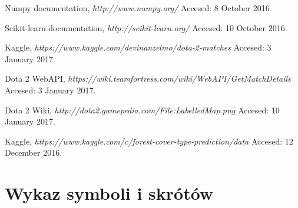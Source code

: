 \documentclass[pl]{minipw} %
\begin{document}
\begin{thebibliography}{20}
  Numpy documentation,
  \emph{http://www.numpy.org/}
  Accesed: 8 October 2016.  
  
  Scikit-learn documentation,
  \emph{http://scikit-learn.org/}  
  Accesed: 10 October 2016.
  
  Kaggle,
  \emph{https://www.kaggle.com/devinanzelmo/dota-2-matches}
  Accesed: 3 January 2017.
  
  Dota 2 WebAPI,
  \emph{https://wiki.teamfortress.com/wiki/WebAPI/GetMatchDetails}
  Accesed: 3 January 2017.
  
  Dota 2 Wiki,
  \emph{http://dota2.gamepedia.com/File:Labelled\textunderscore Map.png}
  Accesed: 10 January 2017.

  Kaggle,
  \emph{https://www.kaggle.com/c/forest-cover-type-prediction/data}
  Accesed: 12 December 2016.

\end{thebibliography}



\chapter*{Wykaz symboli i skrótów}
\end{document}
